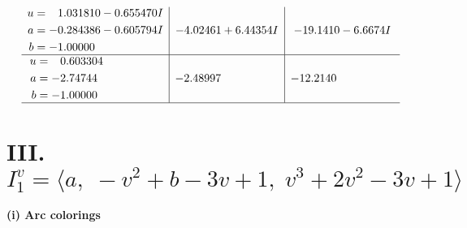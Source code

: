 \documentclass[1p]{elsarticle_modified}
\theoremstyle{definition}
\begin{document}
$$\begin{array}{c|c|c}
\begin{aligned}
u &= \phantom{-}1.031810 - 0.655470 I \\
a &= -0.284386 - 0.605794 I \\
b &= -1.00000\phantom{ +0.000000I}\end{aligned}
 & -4.02461 + 6.44354 I & -19.1410 - 6.6674 I \\ \hline\begin{aligned}
u &= \phantom{-}0.603304\phantom{ +0.000000I} \\
a &= -2.74744\phantom{ +0.000000I} \\
b &= -1.00000\phantom{ +0.000000I}\end{aligned}
 & -2.48997\phantom{ +0.000000I} & -12.2140\phantom{ +0.000000I}\\
 \hline 
 \end{array}$$\newpage\newpage\renewcommand{\arraystretch}{1}
\centering \section*{III. $I^v_{1}= \langle a,\;- v^2+b-3 v+1,\;v^3+2 v^2-3 v+1 \rangle$}
\flushleft \textbf{(i) Arc colorings}\\
\end{document}
